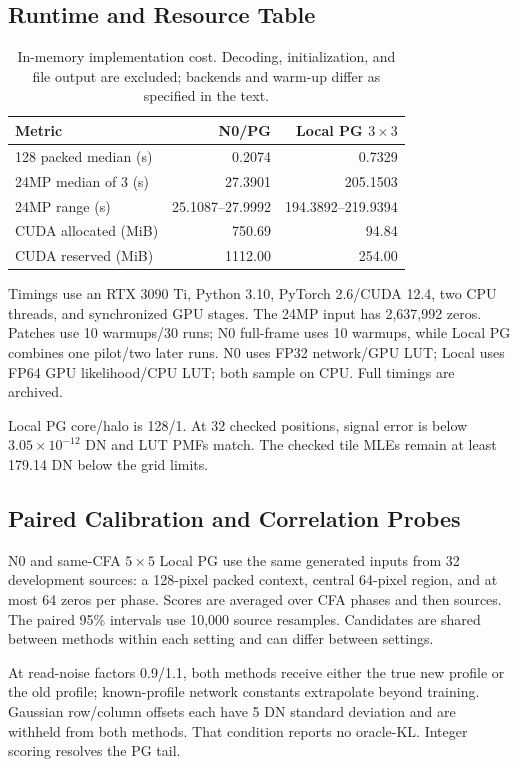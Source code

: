 \documentclass[10pt,twocolumn,journal]{IEEEtran}
\begin{document}
\subsection{Runtime and Resource Table}
\begin{table}[tbp]
\centering
\caption{In-memory implementation cost. Decoding, initialization, and file output are excluded; backends and warm-up differ as specified in the text.}
\label{tab:runtime}
\footnotesize
\begin{tabular}{@{}lrr@{}}
\toprule
Metric & N0/PG & Local PG $3\times3$\\
\midrule
128 packed median (s) & 0.2074 & 0.7329\\
24MP median of 3 (s) & 27.3901 & 205.1503\\
24MP range (s) & 25.1087--27.9992 & 194.3892--219.9394\\
CUDA allocated (MiB) & 750.69 & 94.84\\
CUDA reserved (MiB) & 1112.00 & 254.00\\
\bottomrule
\end{tabular}
\end{table}

Timings use an RTX 3090 Ti, Python 3.10, PyTorch 2.6/CUDA 12.4, two CPU threads, and synchronized GPU stages. The 24MP input has 2,637,992 zeros. Patches use 10 warmups/30 runs; N0 full-frame uses 10 warmups, while Local PG combines one pilot/two later runs. N0 uses FP32 network/GPU LUT; Local uses FP64 GPU likelihood/CPU LUT; both sample on CPU. Full timings are archived.

Local PG core/halo is 128/1. At 32 checked positions, signal error is below $3.05\times10^{-12}$ DN and LUT PMFs match. The checked tile MLEs remain at least 179.14 DN below the grid limits.

\subsection{Paired Calibration and Correlation Probes}
N0 and same-CFA $5\times5$ Local PG use the same generated inputs from 32 development sources: a 128-pixel packed context, central 64-pixel region, and at most 64 zeros per phase. Scores are averaged over CFA phases and then sources. The paired 95\% intervals use 10,000 source resamples. Candidates are shared between methods within each setting and can differ between settings.

At read-noise factors 0.9/1.1, both methods receive either the true new profile or the old profile; known-profile network constants extrapolate beyond training. Gaussian row/column offsets each have 5 DN standard deviation and are withheld from both methods. That condition reports no oracle-KL. Integer scoring resolves the PG tail.
\end{document}
